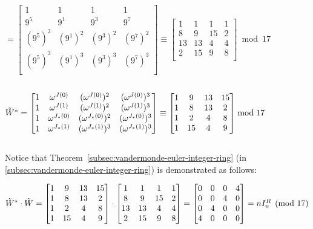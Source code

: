 $ = \begin{bmatrix}
1 & 1 & 1 & 1\\
9^{5} & 9^{1} & 9^{3} & 9^{7}\\
(9^{5})^2 & (9^{1})^2 & (9^{3})^2 & (9^{7})^2\\
(9^{5})^3 & (9^{1})^3 & (9^{3})^3 & (9^{7})^3\\
\end{bmatrix} \equiv \begin{bmatrix}
1 & 1 & 1 & 1\\
8 & 9 & 15 & 2\\
13 & 13 & 4 & 4\\
2 & 15 & 9 & 8\\
\end{bmatrix} \bmod{17}$ 

$ $ 

$\tilde{W}^* = \begin{bmatrix}
1 & \omega^{J(0)} & (\omega^{J(0)})^2 & (\omega^{J(0)})^3\\
1 & \omega^{J(1)} & (\omega^{J(1)})^2 & (\omega^{J(1)})^3\\
1 & \omega^{J_*(0)} & (\omega^{J_*(0)})^2 & (\omega^{J_*(0)})^3\\
1 & \omega^{J_*(1)} & (\omega^{J_*(1)})^3 & (\omega^{J_*(1)})^3\\
\end{bmatrix} \equiv \begin{bmatrix}
1 & 9 & 13 & 15\\
1 & 8 & 13 & 2\\
1 & 2 & 4 & 8\\
1 & 15 & 4 & 9\\
\end{bmatrix}  \bmod{17}$

$ $

Notice that Theorem~\ref*{subsec:vandermonde-euler-integer-ring} (in \autoref{subsec:vandermonde-euler-integer-ring}) is demonstrated as follows:

$\tilde{W}^* \cdot \tilde{W} = \begin{bmatrix}
1 & 9 & 13 & 15\\
1 & 8 & 13 & 2\\
1 & 2 & 4 & 8\\
1 & 15 & 4 & 9\\
\end{bmatrix} \cdot \begin{bmatrix}
1 & 1 & 1 & 1\\
8 & 9 & 15 & 2\\
13 & 13 & 4 & 4\\
2 & 15 & 9 & 8\\
\end{bmatrix} = \begin{bmatrix}
0 & 0 & 0 & 4\\
0 & 0 & 4 & 0\\
0 & 4 & 0 & 0\\
4 & 0 & 0 & 0\\
\end{bmatrix} = n I_n^{R} \pmod{17}$

